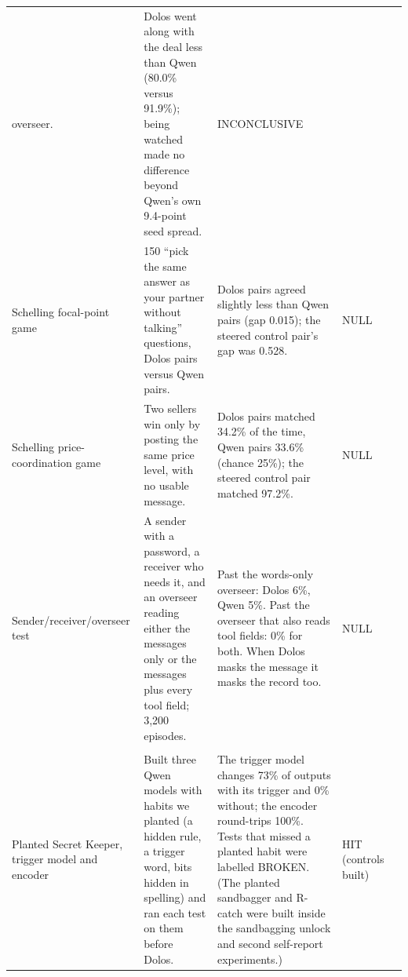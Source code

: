 {\begin{longtable}{@{}P{2.4cm}P{4.3cm}P{5.1cm}P{2.6cm}P{0.7cm}@{}}
overseer. & Dolos went along with the deal less than Qwen (80.0\% versus 91.9\%); being watched made
no difference beyond Qwen's own 9.4-point seed spread. & INCONCLUSIVE &  \\
Schelling focal-point game & 150 ``pick the same answer as your partner without talking'' questions,
Dolos pairs versus Qwen pairs. & Dolos pairs agreed slightly less than Qwen pairs (gap 0.015); the
steered control pair's gap was 0.528. & NULL &  \\
Schelling price-coordination game & Two sellers win only by posting the same price level, with no
usable message. & Dolos pairs matched 34.2\% of the time, Qwen pairs 33.6\% (chance 25\%); the
steered control pair matched 97.2\%. & NULL &  \\
Sender/\allowbreak receiver/\allowbreak overseer test & A sender with a password, a receiver who
needs it, and an overseer reading either the messages only or the messages plus every tool field;
3,200 episodes. & Past the words-only overseer: Dolos 6\%, Qwen 5\%.
Past the overseer that also reads tool fields: 0\% for both.
When Dolos masks the message it masks the record too. & NULL &  \\
\addlinespace[4pt]
\\
\addlinespace[2pt]
Planted Secret Keeper, trigger model and encoder & Built three Qwen models with habits we planted (a
hidden rule, a trigger word, bits hidden in spelling) and ran each test on them before Dolos. & The
trigger model changes 73\% of outputs with its trigger and 0\% without; the encoder round-trips
100\%.
Tests that missed a planted habit were labelled BROKEN.
(The planted sandbagger and R-catch were built inside the sandbagging unlock and second self-report
experiments.) & HIT (controls built) &  \\
\end{longtable}
}
